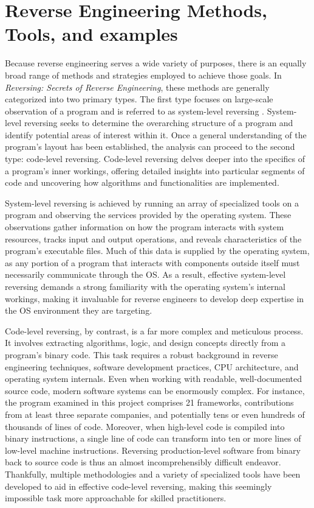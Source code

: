 \chapter{Reverse Engineering Methods, Tools, and examples}
Because reverse engineering serves a wide variety of purposes, there is an equally broad range of methods and strategies employed to achieve those goals. In \textit{Reversing: Secrets of Reverse Engineering}, these methods are generally categorized into two primary types. The first type focuses on large-scale observation of a program and is referred to as system-level reversing \cite{Reversing}. System-level reversing seeks to determine the overarching structure of a program and identify potential areas of interest within it. Once a general understanding of the program’s layout has been established, the analysis can proceed to the second type: code-level reversing. Code-level reversing delves deeper into the specifics of a program’s inner workings, offering detailed insights into particular segments of code and uncovering how algorithms and functionalities are implemented.

System-level reversing is achieved by running an array of specialized tools on a program and observing the services provided by the operating system. These observations gather information on how the program interacts with system resources, tracks input and output operations, and reveals characteristics of the program’s executable files. Much of this data is supplied by the operating system, as any portion of a program that interacts with components outside itself must necessarily communicate through the OS. As a result, effective system-level reversing demands a strong familiarity with the operating system’s internal workings, making it invaluable for reverse engineers to develop deep expertise in the OS environment they are targeting.

Code-level reversing, by contrast, is a far more complex and meticulous process. It involves extracting algorithms, logic, and design concepts directly from a program’s binary code. This task requires a robust background in reverse engineering techniques, software development practices, CPU architecture, and operating system internals. Even when working with readable, well-documented source code, modern software systems can be enormously complex. For instance, the program examined in this project comprises 21 frameworks, contributions from at least three separate companies, and potentially tens or even hundreds of thousands of lines of code. Moreover, when high-level code is compiled into binary instructions, a single line of code can transform into ten or more lines of low-level machine instructions. Reversing production-level software from binary back to source code is thus an almost incomprehensibly difficult endeavor. Thankfully, multiple methodologies and a variety of specialized tools have been developed to aid in effective code-level reversing, making this seemingly impossible task more approachable for skilled practitioners.

